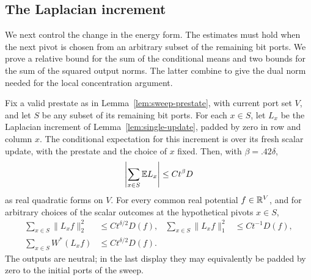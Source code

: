 \subsection{The Laplacian increment}

We next control the change in the energy form.  The estimates must hold
when the next pivot is chosen from an arbitrary subset of the remaining
bit ports.  We prove a relative bound for the sum of the conditional
means and two bounds for the sum of the squared output norms.  The latter
combine to give the dual norm needed for the local concentration argument.

\begin{lemma}\label{lem:sweep-laplacian}
Fix a valid prestate as in Lemma~\ref{lem:sweep-prestate}, with current
port set \(V\), and let \(S\) be any subset of its remaining bit ports.
For each \(x\in S\), let \(L_x\) be the Laplacian increment of
Lemma~\ref{lem:single-update}, padded by zero in row and column \(x\).
The conditional expectation for this increment is over its fresh scalar
update, with the prestate and the choice of \(x\) fixed.
Then, with \(\beta=.42\delta\),
\begin{equation}\label{eq:sweep-laplacian-mean}
 \left|\sum_{x\in S}\mathbb E L_x\right|\le Ct^\beta D
\end{equation}
as real quadratic forms on \(V\).  For every common real potential
\(f\in\mathbb R^V\), and for arbitrary choices of the scalar outcomes at the
hypothetical pivots \(x\in S\),
\begin{align}
 \sum_{x\in S}\|L_xf\|_2^2
   &\le Ct^{\delta/2}D(f),&
 \sum_{x\in S}\|L_xf\|_1^2
   &\le Ct^{-1}D(f),                                      \label{eq:sweep-laplacian-stacks}\\
 \sum_{x\in S}W^*(L_xf)
   &\le Ct^{\delta/2}D(f).                                 \label{eq:sweep-laplacian-dual-stack}
\end{align}
The outputs are neutral; in the last display they may equivalently be
padded by zero to the initial ports of the sweep.
\end{lemma}

